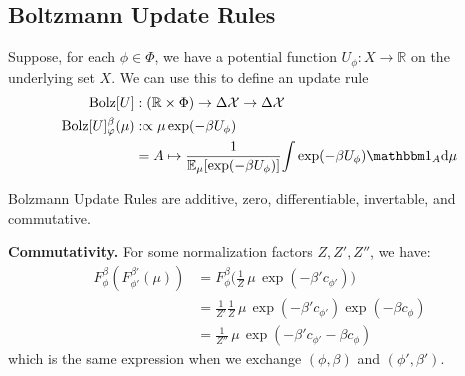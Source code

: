 \documentclass{article}
\begin{document}
\subsection{Boltzmann Update Rules}
%
%
\def\Bolz#1{\mathrm{Bolz}[#1]}
Suppose, for each $\phi \in \Phi$, we have a potential function $U_\phi : X \to \mathbb R$ on the underlying set $X$.
We can use this to define an update rule
\begin{align*}
    \Bolz U &: (\mathbb R \times \Phi) \to \Delta\X \to \Delta\X \\
    \Bolz U^\beta_\varphi(\mu)
        &:\propto
            \mu \exp(-\beta U_\phi) \\
        &= A \mapsto \frac
            1{\Ex_{\mu} [ \exp(-\beta U_\phi)]}
            {\int \exp(-\beta U_\phi) \mathbbm 1_A \mathrm d\mu }
\end{align*}

\begin{prop}
    Bolzmann Update Rules are additive, zero, differentiable, invertable, and commutative.
\end{prop}

\begin{lproof}
    \textbf{Commutativity.}
    For some normalization factors $Z, Z', Z''$, we have:
    \begin{align*}
         F^\beta_\phi( F^{\beta'}_{\phi'}(\mu))
         &= F^\beta_\phi \Big( \frac{1}{Z} \,\mu\, \exp(- \beta' c_{\phi'}) \Big) \\
         &= \frac{1}{Z'} \frac{1}{Z} \,\mu\, \exp(- \beta' c_{\phi'}) \exp(- \beta c_{\phi}) \\
         &= \frac{1}{Z''} \,\mu\, \exp(-\beta' c_{\phi'} - \beta c_\phi)
    \end{align*}
    which is the same expression when we exchange $(\phi, \beta)$ and $(\phi', \beta')$.
\end{lproof}
\end{document}
